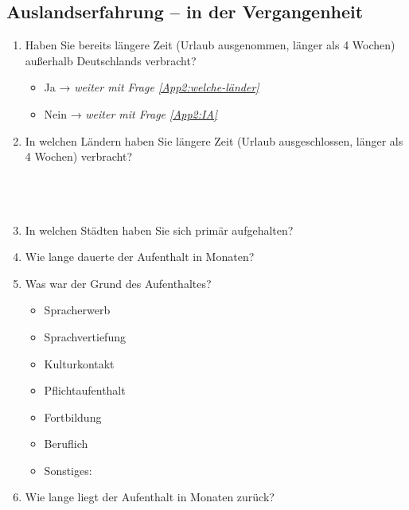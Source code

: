 \subsection*{Auslandserfahrung -- in der Vergangenheit}


\begin{enumerate}[resume]
\item  Haben Sie bereits längere Zeit (Urlaub ausgenommen, länger als 4 Wochen) außerhalb Deutschlands verbracht?\label{App2:generell-ausland}

		\begin{itemize}
		\item[\Circle] Ja → \textit{weiter mit Frage \ref{App2:welche-länder}}
        \item[\Circle] Nein → \textit{weiter mit Frage \ref{App2:IA}}
        \end{itemize}

\item In welchen Ländern haben Sie längere Zeit (Urlaub ausgeschlossen, länger als 4 Wochen) verbracht?\\\label{App2:welche-länder}
	   \underline{\hspace{7.5cm}}\\
       \underline{\hspace{7.5cm}}\\
       \underline{\hspace{7.5cm}}\\
       \underline{\hspace{7.5cm}}


\item In welchen Städten haben Sie sich primär aufgehalten?\\
	   \underline{\hspace{7.5cm}}


\item Wie lange dauerte der Aufenthalt in Monaten?\\
	   \underline{\hspace{7.5cm}}


\item Was war der Grund des Aufenthaltes?

		\begin{itemize}
		\item[\Circle] Spracherwerb 
        \item[\Circle] Sprachvertiefung 
        \item[\Circle] Kulturkontakt
        \item[\Circle] Pflichtaufenthalt
        \item[\Circle] Fortbildung
        \item[\Circle] Beruflich
        \item[\Circle] Sonstiges:~\underline{\hspace{7.5cm}}
        \end{itemize}


\item Wie lange liegt der Aufenthalt in Monaten zurück?\\
	   \underline{\hspace{7.5cm}}
\end{enumerate}

